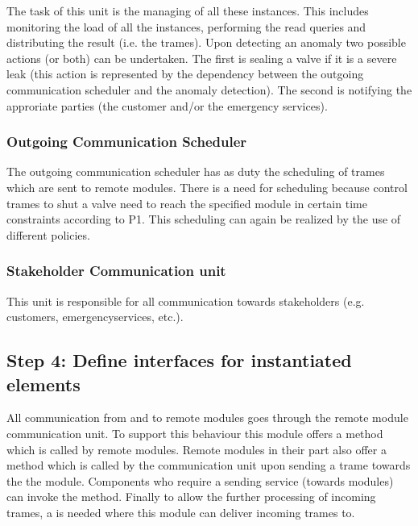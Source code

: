 \npar The task of this unit is the managing of all these instances. This
includes monitoring the load of all the instances, performing the read queries
and distributing the result (i.e. the trames). Upon detecting an anomaly two
possible actions (or both) can be undertaken. The first is sealing a valve if
it is a severe leak (this action is represented by the dependency between the
outgoing communication scheduler and the anomaly detection). The second is
notifying the approriate parties (the customer and/or the emergency services).

\subsubsection{Outgoing Communication Scheduler}

\npar The outgoing communication scheduler has as duty the scheduling of
trames which are sent to remote modules. There is a need for scheduling because
control trames to shut a valve need to reach the specified module in certain
time constraints according to P1. This scheduling can again be realized by the
use of different policies.

\subsubsection{Stakeholder Communication unit}

\npar This unit is responsible for all communication towards stakeholders (e.g.
customers, emergencyservices, etc.). 

\subsection{Step 4: Define interfaces for instantiated elements}
\label{add:it1/interfaces}


\npar All communication from and to remote modules goes through the remote
module communication unit. To support this behaviour this module offers a
 method which is called by remote modules. Remote
modules in their part also offer a  method which is called
by the communication unit upon sending a trame towards the the module. Components
who require a sending service (towards modules) can invoke the
 method. Finally to allow the further processing of
incoming trames, a  is needed where this
module can deliver incoming trames to.


